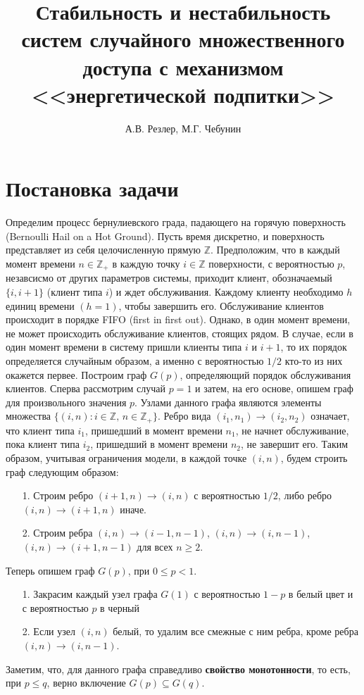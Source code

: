 \documentclass[10pt, reqno]{amsart}
\title[\myshorttitle]{Стабильность и нестабильность систем случайного множественного доступа с механизмом <<энергетической подпитки>>}
\author{{А.В. Резлер, М.Г. Чебунин}}%
\begin{document}
\renewcommand{\refname}{References}
\renewcommand{\proofname}{Доказательство.}
\renewcommand{\figurename}{Fig.}
\thispagestyle{empty}
\section{Постановка задачи}
Определим процесс бернулиевского града, падающего на горячую поверхность (Bernoulli Hail on a Hot Ground). Пусть время дискретно, и поверхность представляет из себя целочисленную прямую $\mathbb{Z}$. Предположим, что в каждый момент времени $n \in \mathbb{Z}_{+}$ в каждую точку $i \in \mathbb{Z}$ поверхности, с вероятностью $p$, незавсисмо от других параметров системы, приходит клиент, обозначаемый $\{i, i+1\}$ (клиент типа $i$) и ждет обслуживания. Каждому клиенту необходимо $h$ единиц времени $(h=1)$, чтобы завершить его. Обслуживание клиентов происходит в порядке FIFO (first in first out). Однако, в один момент времени, не может происходить обслуживание клиентов, стоящих рядом. В случае, если в один момент времени в систему пришли клиенты типа $i$ и $i+1$, то их порядок определяется случайным образом, а именно с вероятностью $1/2$ кто-то из них окажется первее. Построим граф $G(p)$, определяющий порядок обслуживания клиентов. Сперва рассмотрим случай $p=1$ и затем, на его основе, опишем граф для произвольного значения $p$. Узлами данного графа являются элементы множества $\{(i,n) : i \in \mathbb{Z} \text{,  } n \in \mathbb{Z}_{+}\}$. Ребро вида $(i_{1},n_{1}) \xrightarrow{} (i_{2},n_{2})$ означает, что клиент типа $i_{1}$, пришедший в момент времени $n_{1}$, не начнет обслуживание, пока клиент типа $i_{2}$, пришедший в момент времени $n_{2}$, не завершит его. Таким образом, учитывая ограничения модели, в каждой точке $(i, n)$, будем строить граф следующим образом:
\begin{enumerate} 
  \item[1.] Строим ребро $(i+1,n) \xrightarrow{} (i,n)$ с вероятностью $1/2$, либо ребро $(i,n) \xrightarrow{} (i+1,n)$ иначе.
  \item[2.] Строим ребра $(i,n) \xrightarrow{} (i-1,n-1)$, $(i,n) \xrightarrow{} (i,n-1)$, $(i,n) \xrightarrow{} (i+1,n-1)$ для всех $n \geq 2$.
\end{enumerate}
Теперь опишем граф $G(p)$, при $0 \leq p < 1$.
\begin{enumerate} 
  \item[1.] Закрасим каждый узел графа $G(1)$ с вероятностью $1-p$ в белый цвет и с вероятностью $p$ в черный
  \item[2.] Если узел $(i,n)$ белый, то удалим все смежные с ним ребра, кроме ребра $(i,n) \xrightarrow{} (i,n-1)$.
\end{enumerate}
Заметим, что, для данного графа справедливо \textbf{свойство монотонности}, то есть, при $p \leq q$, верно включение $G(p) \subseteq G(q)$.\\
\end{document}
